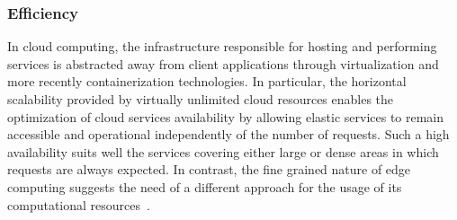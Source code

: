 

\subsubsection*{Efficiency}\label{sec:efficiency}


In cloud computing, the infrastructure responsible for hosting and performing services is abstracted away from client applications through virtualization and more recently containerization technologies. In particular, the horizontal scalability provided by virtually unlimited cloud resources enables the optimization of cloud services availability by allowing elastic services to remain accessible and operational independently of the number of requests. Such a high availability suits well the services covering either large or dense areas in which requests are always expected. In contrast, the fine grained nature of edge computing suggests the need of a different approach for the usage of its computational resources~\cite{GarrigaMendonca2017}.

